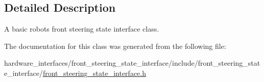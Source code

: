 \subsection{Detailed Description}
A basic robot\textquotesingle{}s front steering state interface class. 

The documentation for this class was generated from the following file\+:\begin{DoxyCompactItemize}
\item 
hardware\+\_\+interfaces/front\+\_\+steering\+\_\+state\+\_\+interface/include/front\+\_\+steering\+\_\+state\+\_\+interface/\hyperlink{front__steering__state__interface_8h}{front\+\_\+steering\+\_\+state\+\_\+interface.\+h}\end{DoxyCompactItemize}
